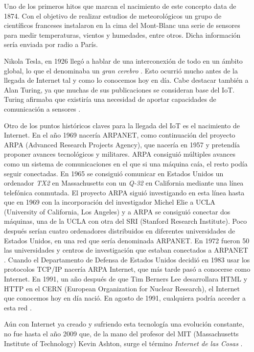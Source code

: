 \documentclass[a4paper, 12pt, oneside]{book}
\begin{document}
Uno de los primeros hitos que marcan el nacimiento de este concepto data de 1874. Con el objetivo de realizar estudios de meteorológicos un grupo de científicos franceses instalaron en la cima del Mont-Blanc una serie de sensores para medir temperaturas, vientos y humedades, entre otros. Dicha información sería enviada por radio a París\cite{iot_origen}.

Nikola Tesla, en 1926 llegó a hablar de una interconexión de todo en un ámbito global, lo que el denominaba un \textit{gran cerebro} \cite{gran_cerebro_tesla}. Esto ocurrió mucho antes de la llegada de Internet tal y como lo conocemos hoy en día. Cabe destacar también a Alan Turing, ya que muchas de sus publicaciones se consideran base del IoT.  Turing afirmaba que existiría una necesidad de aportar capacidades de comunicación a sensores \cite{alan_turing_iot}.

Otro de los puntos históricos claves para la llegada del IoT es el nacimiento de Internet. En el año 1969 nacería ARPANET, como continuación del proyecto ARPA (Advanced Research Projects Agency), que nacería en 1957 y  pretendía proponer avances tecnológicos y militares. ARPA consiguió múltiples avances como un sistema de comunicaciones en el que si una máquina caía, el resto podía seguir conectadas. 
En 1965 se consiguió comunicar en Estados Unidos un ordenador \textit{TX2} en Massachusetts con un \textit{Q-32} en California mediante una línea telefónica conmutada.
El proyecto ARPA siguió investigando en esta línea hasta que en 1969 con la incorporación del investigador Michel Elie a UCLA (University of California, Los Angeles) y a ARPA se consiguió conectar dos máquinas, una de la UCLA con otra del SRI (Stanford Research Institute). Poco después serían cuatro ordenadores distribuidos en diferentes universidades de Estados Unidos, en una red que sería denominada ARPANET.
En 1972 fueron 50 las universidades y centros de investigación que estaban conectados a ARPANET \cite{arpa_arpanet}.
Cuando el Departamento de Defensa de Estados Unidos decidió en 1983 usar los protocolos TCP/IP nacería ARPA Internet, que más tarde pasó a conocerse como Internet. En 1991, un año después de que Tim Berners Lee desarrollara HTML y HTTP en el CERN (European Organization for Nuclear Research), el Internet que conocemos hoy en día nació. En agosto de 1991, cualquiera podría acceder a esta red \cite{Tim_Berners_Lee}.

Aún con Internet ya creado y sufriendo esta tecnología una evolución constante, no fue hasta el año 2009 que, de la mano del profesor del MIT (Massachusetts Institute of Technology) Kevin Ashton, surge el término \textit{Internet de las Cosas} \cite{Kevin_Ashton}.
\end{document}
